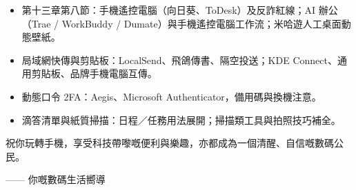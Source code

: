 
\begin{itemize}
  \item 第十三章第八節：手機遙控電腦（向日葵、ToDesk）及反詐紅線；AI 辦公（Trae / WorkBuddy / Dumate）與手機遙控電腦工作流；米哈遊人工桌面動態壁紙。
  \item 局域網快傳與剪貼板：LocalSend、飛鴿傳書、隔空投送；KDE Connect、通用剪貼板、品牌手機電腦互傳。
  \item 動態口令 2FA：Aegis、Microsoft Authenticator，備用碼與換機注意。
  \item 滴答清單與紙質掃描：日程／任務用法展開；掃描類工具與拍照技巧補全。
\end{itemize}

祝你玩轉手機，享受科技帶嚟嘅便利與樂趣，亦都成為一個清醒、自信嘅數碼公民。

—— 你嘅數碼生活嚮導
